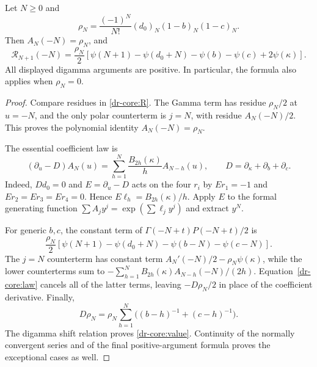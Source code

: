 \begin{proposition}
\label{dr-core:collapse}
Let $N\geq0$ and
\begin{equation}
 \rho_N=\frac{(-1)^N}{N!}(d_0)_N(1-b)_N(1-c)_N.
 \label{dr-core:rho}
\end{equation}
Then $A_N(-N)=\rho_N$, and
\begin{equation}
 \mathcal R_{N+1}(-N)=\frac{\rho_N}{2}
 [\psi(N+1)-\psi(d_0+N)-\psi(b)-\psi(c)+2\psi(\kappa)].
 \label{dr-core:value}
\end{equation}
All displayed digamma arguments are positive. In particular, the formula
also applies when $\rho_N=0$.
\end{proposition}
\begin{proof}
Compare residues in \eqref{dr-core:R}. The Gamma term has residue
$\rho_N/2$ at $u=-N$, and the only polar counterterm is $j=N$, with
residue $A_N(-N)/2$. This proves the polynomial identity $A_N(-N)=\rho_N$.

The essential coefficient law is
\begin{equation}
 (\partial_u-D)A_N(u)=\sum_{h=1}^N\frac{B_{2h}(\kappa)}hA_{N-h}(u),
 \qquad D=\partial_\kappa+\partial_b+\partial_c.
 \label{dr-core:law}
\end{equation}
Indeed, $Dd_0=0$ and $E=\partial_u-D$ acts on the four $r_i$ by
$Er_1=-1$ and $Er_2=Er_3=Er_4=0$. Hence
$E\ell_h=B_{2h}(\kappa)/h$. Apply $E$ to the formal generating function
$\sum A_jy^j=\exp(\sum\ell_jy^j)$ and extract $y^N$.

For generic $b,c$, the constant term of $\Gamma(-N+t)P(-N+t)/2$ is
\[
 \frac{\rho_N}{2}
 [\psi(N+1)-\psi(d_0+N)-\psi(b-N)-\psi(c-N)].
\]
The $j=N$ counterterm has constant term
$A_N'(-N)/2-\rho_N\psi(\kappa)$, while the lower counterterms sum to
$-\sum_{h=1}^N B_{2h}(\kappa)A_{N-h}(-N)/(2h)$.
Equation~\eqref{dr-core:law} cancels all of the latter terms, leaving
$-D\rho_N/2$ in place of the coefficient derivative. Finally,
\[
 D\rho_N=\rho_N\sum_{h=1}^N\bigl((b-h)^{-1}+(c-h)^{-1}\bigr).
\]
The digamma shift relation proves \eqref{dr-core:value}. Continuity of
the normally convergent series and of the final positive-argument formula
proves the exceptional cases as well.
\end{proof}

